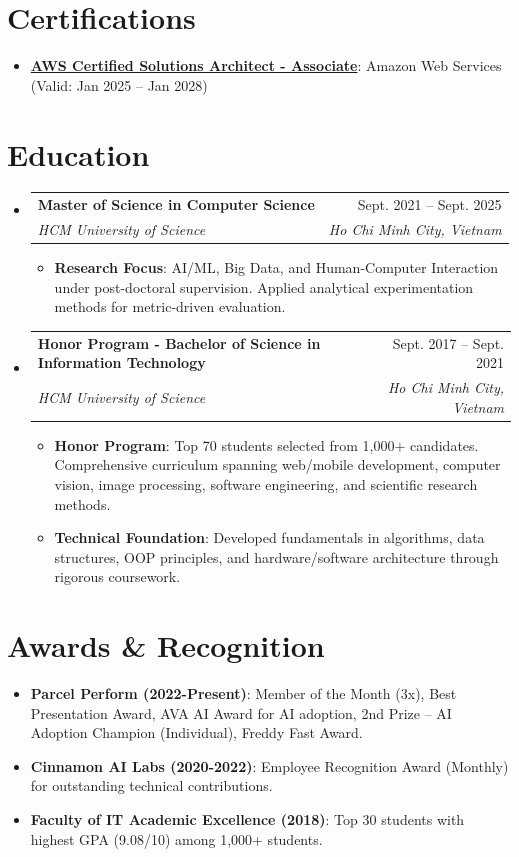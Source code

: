 \documentclass[letterpaper,11pt]{article}
\makeatletter
\newcommand{\resumeItem}[2]{
  \item\small{
    \textbf{#1}{: #2 \vspace{-2pt}}
  }
}
\newcommand{\resumeSubheading}[4]{
  \vspace{-1pt}\item
    \begin{tabular*}{0.97\textwidth}{l@{\extracolsep{\fill}}r}
      \textbf{#1} & #2 \\
      \textit{\small#3} & \textit{\small #4} \\
    \end{tabular*}\vspace{-5pt}
}
\newcommand{\resumeSubItem}[2]{\resumeItem{#1}{#2}\vspace{-4pt}}
\newcommand{\resumeSubHeadingListStart}{\begin{itemize}[leftmargin=*]}
\newcommand{\resumeSubHeadingListEnd}{\end{itemize}}
\newcommand{\resumeItemListStart}{\begin{itemize}}
\newcommand{\resumeItemListEnd}{\end{itemize}\vspace{-5pt}}
\makeatother
\begin{document}
\section{Certifications}
  \resumeSubHeadingListStart
    \resumeSubItem{\href{https://cp.certmetrics.com/amazon/en/public/verify/credential/0fab492eac674ecaa39ecf5d616a902c}{AWS Certified Solutions Architect - Associate}}
      {Amazon Web Services (Valid: Jan 2025 -- Jan 2028)}
  \resumeSubHeadingListEnd

\section{Education}
  \resumeSubHeadingListStart
    \resumeSubheading
      {Master of Science in Computer Science}{Sept. 2021 -- Sept. 2025}
      {HCM University of Science}{Ho Chi Minh City, Vietnam}
      \resumeItemListStart
        \resumeItem{Research Focus}
          {AI/ML, Big Data, and Human-Computer Interaction under post-doctoral supervision. Applied analytical experimentation methods for metric-driven evaluation.}
      \resumeItemListEnd
    \resumeSubheading
      {Honor Program - Bachelor of Science in Information Technology}{Sept. 2017 -- Sept. 2021}
      {HCM University of Science}{Ho Chi Minh City, Vietnam}
      \resumeItemListStart
        \resumeItem{Honor Program}
          {Top 70 students selected from 1,000+ candidates. Comprehensive curriculum spanning web/mobile development, computer vision, image processing, software engineering, and scientific research methods.}
        \resumeItem{Technical Foundation}
          {Developed fundamentals in algorithms, data structures, OOP principles, and hardware/software architecture through rigorous coursework.}
      \resumeItemListEnd
  \resumeSubHeadingListEnd

\section{Awards \& Recognition}
  \resumeSubHeadingListStart
    \resumeSubItem{Parcel Perform (2022-Present)}
      {Member of the Month (3x), Best Presentation Award, AVA AI Award for AI adoption, 2nd Prize -- AI Adoption Champion (Individual), Freddy Fast Award.}
    \resumeSubItem{Cinnamon AI Labs (2020-2022)}
      {Employee Recognition Award (Monthly) for outstanding technical contributions.}
    \resumeSubItem{Faculty of IT Academic Excellence (2018)}
      {Top 30 students with highest GPA (9.08/10) among 1,000+ students.}
  \resumeSubHeadingListEnd
\end{document}
